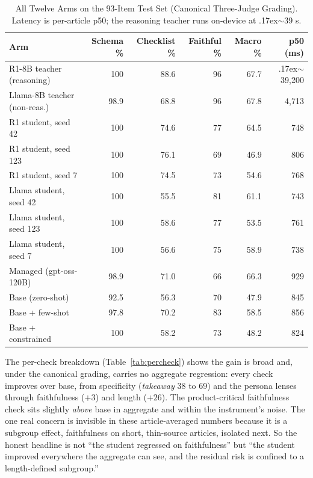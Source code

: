 \documentclass[10pt,journal]{IEEEtran}
\begin{document}
\begin{table}[t]
\centering
\caption{All Twelve Arms on the 93-Item Test Set (Canonical Three-Judge Grading). Latency is per-article p50; the reasoning teacher runs on-device at {\raise.17ex\hbox{$\scriptstyle\sim$}}39 s.}
\label{tab:arms}
\small
\begin{tabular}{@{}lrrrrr@{}}
\toprule
Arm & Schema \% & Checklist \% & Faithful \% & Macro \% & p50 (ms) \\
\midrule
R1-8B teacher (reasoning) & 100 & 88.6 & 96 & 67.7 & {\raise.17ex\hbox{$\scriptstyle\sim$}}39{,}200 \\
Llama-8B teacher (non-reas.) & 98.9 & 68.8 & 96 & 67.8 & 4{,}713 \\
\midrule
R1 student, seed 42 & 100 & 74.6 & 77 & 64.5 & 748 \\
R1 student, seed 123 & 100 & 76.1 & 69 & 46.9 & 806 \\
R1 student, seed 7 & 100 & 74.5 & 73 & 54.6 & 768 \\
Llama student, seed 42 & 100 & 55.5 & 81 & 61.1 & 743 \\
Llama student, seed 123 & 100 & 58.6 & 77 & 53.5 & 761 \\
Llama student, seed 7 & 100 & 56.6 & 75 & 58.9 & 738 \\
Managed (gpt-oss-120B) & 98.9 & 71.0 & 66 & 66.3 & 929 \\
\midrule
Base (zero-shot) & 92.5 & 56.3 & 70 & 47.9 & 845 \\
Base + few-shot & 97.8 & 70.2 & 83 & 58.5 & 856 \\
Base + constrained & 100 & 58.2 & 73 & 48.2 & 824 \\
\bottomrule
\end{tabular}
\end{table}

The per-check breakdown (Table~\ref{tab:percheck}) shows the gain is broad and, under the canonical grading, carries no aggregate regression: every check improves over base, from specificity (\emph{takeaway} 38 to 69) and the persona lenses through faithfulness ($+3$) and length ($+26$). The product-critical faithfulness check sits slightly \emph{above} base in aggregate and within the instrument's noise. The one real concern is invisible in these article-averaged numbers because it is a subgroup effect, faithfulness on short, thin-source articles, isolated next. So the honest headline is not ``the student regressed on faithfulness'' but ``the student improved everywhere the aggregate can see, and the residual risk is confined to a length-defined subgroup.''
\end{document}
